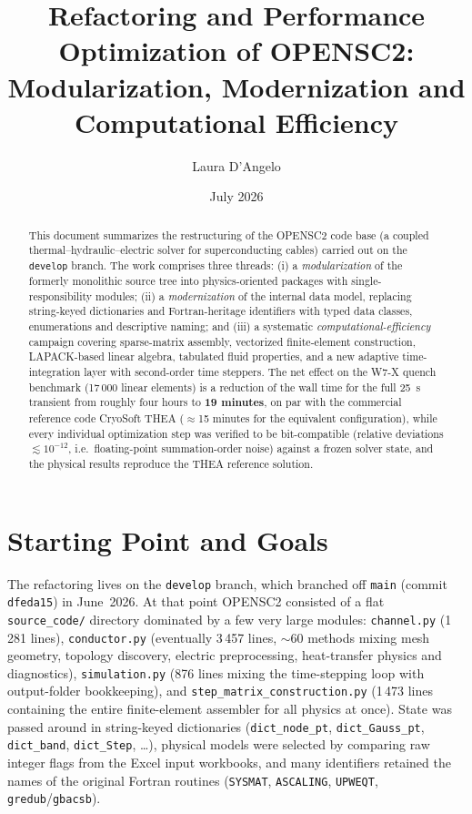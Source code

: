\documentclass[11pt,a4paper]{article}
\title{Refactoring and Performance Optimization of OPENSC2:\\
Modularization, Modernization and Computational Efficiency}
\author{Laura D'Angelo}
\date{July 2026}
\newcommand{\code}[1]{\texttt{#1}}
\begin{document}
\maketitle

\begin{abstract}
This document summarizes the restructuring of the OPENSC2 code base (a coupled
thermal--hydraulic--electric solver for superconducting cables) carried out on the
\code{develop} branch. The work comprises three threads: (i) a \emph{modularization}
of the formerly monolithic source tree into physics-oriented packages with
single-responsibility modules; (ii) a \emph{modernization} of the internal data model,
replacing string-keyed dictionaries and Fortran-heritage identifiers with typed
data classes, enumerations and descriptive naming; and (iii) a systematic
\emph{computational-efficiency} campaign covering sparse-matrix assembly, vectorized
finite-element construction, LAPACK-based linear algebra, tabulated fluid properties,
and a new adaptive time-integration layer with second-order time steppers.
The net effect on the W7-X quench benchmark (17\,000 linear elements) is a reduction
of the wall time for the full \SI{25}{s} transient from roughly four hours to
\textbf{19 minutes}, on par with the commercial reference code CryoSoft THEA
($\approx$15 minutes for the equivalent configuration), while every individual
optimization step was verified to be bit-compatible (relative deviations
$\lesssim 10^{-12}$, i.e.\ floating-point summation-order noise) against a frozen
solver state, and the physical results reproduce the THEA reference solution.
\end{abstract}

\tableofcontents

\section{Starting Point and Goals}

The refactoring lives on the \code{develop} branch, which branched off \code{main}
(commit \code{dfeda15}) in June~2026. At that point OPENSC2 consisted of a flat
\code{source\_code/} directory dominated by a few very large modules:
\code{channel.py} (1\,281 lines), \code{conductor.py} (eventually 3\,457 lines,
$\sim$60 methods mixing mesh geometry, topology discovery, electric preprocessing,
heat-transfer physics and diagnostics), \code{simulation.py} (876 lines mixing the
time-stepping loop with output-folder bookkeeping), and
\code{step\_matrix\_construction.py} (1\,473 lines containing the entire
finite-element assembler for all physics at once). State was passed around in
string-keyed dictionaries (\code{dict\_node\_pt}, \code{dict\_Gauss\_pt},
\code{dict\_band}, \code{dict\_Step}, \ldots), physical models were selected by
comparing raw integer flags from the Excel input workbooks, and many identifiers
retained the names of the original Fortran routines (\code{SYSMAT}, \code{ASCALING},
\code{UPWEQT}, \code{gredub}/\code{gbacsb}).
\end{document}

